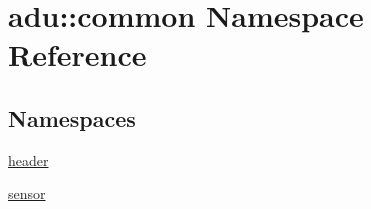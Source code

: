 \hypertarget{namespaceadu_1_1common}{\section{adu\-:\-:common Namespace Reference}
\label{namespaceadu_1_1common}
}
\subsection*{Namespaces}
\begin{DoxyCompactItemize}
\item 
\hyperlink{namespaceadu_1_1common_1_1header}{header}
\item 
\hyperlink{namespaceadu_1_1common_1_1sensor}{sensor}
\end{DoxyCompactItemize}
